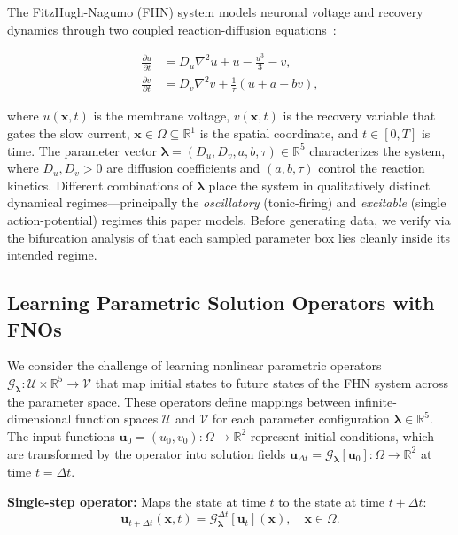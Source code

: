 \documentclass[runningheads]{llncs}
\begin{document}
The FitzHugh-Nagumo (FHN) system models neuronal voltage and recovery dynamics through two coupled reaction-diffusion equations~\cite{FitzHugh1961,Nagumo1962}:

\begin{align}
\frac{\partial u}{\partial t} &= D_u \nabla^2 u + u - \frac{u^3}{3} - v, \label{eq:fhn_u} \\
\frac{\partial v}{\partial t} &= D_v \nabla^2 v + \frac{1}{\tau}(u + a - b v), \label{eq:fhn_v}
\end{align}

\noindent where $u(\bm{x},t)$ is the membrane voltage, $v(\bm{x},t)$ is the recovery variable that gates the slow current, $\bm{x} \in \Omega \subseteq \mathbb{R}^1$ is the spatial coordinate, and $t \in [0,T]$ is time. The parameter vector $\bm{\lambda} = (D_u, D_v, a, b, \tau) \in \mathbb{R}^5$ characterizes the system, where $D_u, D_v > 0$ are diffusion coefficients and $(a, b, \tau)$ control the reaction kinetics. Different combinations of $\bm{\lambda}$ place the system in qualitatively distinct dynamical regimes---principally the \emph{oscillatory} (tonic-firing) and \emph{excitable} (single action-potential) regimes this paper models. Before generating data, we verify via the bifurcation analysis of  that each sampled parameter box lies cleanly inside its intended regime.

\subsection{Learning Parametric Solution Operators with FNOs}

We consider the challenge of learning nonlinear parametric operators $\mathcal{G}_{\bm{\lambda}}: \mathcal{U} \times \mathbb{R}^5 \rightarrow \mathcal{V}$ that map initial states to future states of the FHN system across the parameter space. These operators define mappings between infinite-dimensional function spaces $\mathcal{U}$ and $\mathcal{V}$ for each parameter configuration $\bm{\lambda} \in \mathbb{R}^5$. The input functions $\bm{u}_0 = (u_0, v_0): \Omega \rightarrow \mathbb{R}^2$ represent initial conditions, which are transformed by the operator into solution fields $\bm{u}_{\Delta t} = \mathcal{G}_{\bm{\lambda}}[\bm{u}_0]: \Omega \rightarrow \mathbb{R}^2$ at time $t = \Delta t$.

\noindent\textbf{Single-step operator:} Maps the state at time $t$ to the state at time $t + \Delta t$:
\begin{equation}
    \bm{u}_{t+\Delta t}(\bm{x},t) = \mathcal{G}_{\bm{\lambda}}^{\Delta t}[\bm{u}_t](\bm{x}), \quad \bm{x} \in \Omega.
    \label{eq:single_step}
\end{equation}
\end{document}
